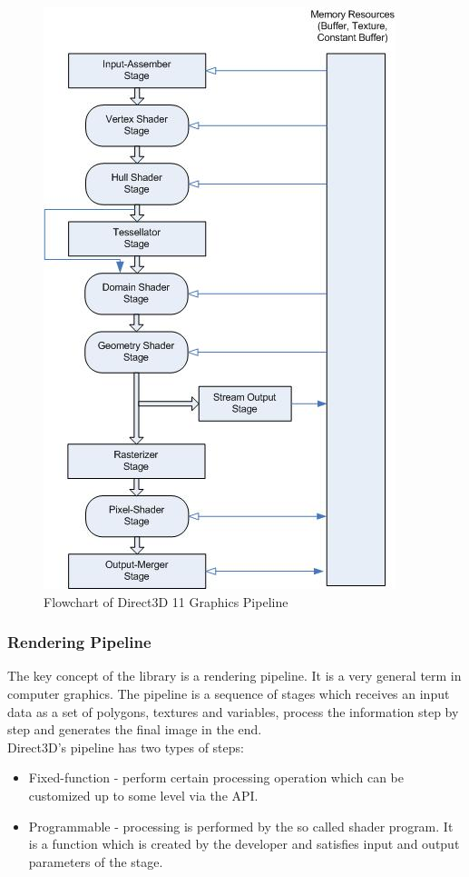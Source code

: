 \documentclass[twoside, english, 11pt]{report}
\begin{document}
 \begin{figure}[!h]
\centerline{\includegraphics[scale=1]{img/pipeline}}
\caption{Flowchart of Direct3D 11 Graphics Pipeline\label{fig:pipeline}}
\end{figure}
\subsubsection{Rendering Pipeline}
The key concept of the library is a rendering pipeline. It is a very general term in computer graphics. The pipeline is a sequence of stages which receives an input data as a set of polygons, textures and variables, process the information step by step and generates the final image in the end.\\

Direct3D's pipeline has two types of steps:
\begin{itemize} 
\item Fixed-function - perform certain processing operation which can be customized up to some level via the API.
\item Programmable - processing is performed by the so called shader program. It is a function which is created by the developer and satisfies input and output parameters of the stage.
\end{itemize}
\end{document}
